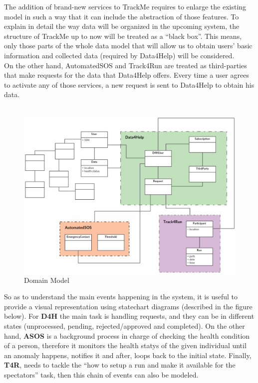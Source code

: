 \documentclass[12pt]{article}
\begin{document}
The addition of brand-new services to TrackMe requires to enlarge the existing model in such a way that it can include the abstraction of those features. To explain in detail the way data will be organized in the upcoming system, the structure of TrackMe up to now will be treated as a “black box”. This means, only those parts of the whole data model that will allow us to obtain users’ basic information and collected data (required by Data4Help) will be considered. \\

 On the other hand, AutomatedSOS and Track4Run are treated as third-parties that make requests for the data that Data4Help offers. Every time a user agrees to activate any of those services, a new request is sent to Data4Help to obtain his data. \\\\

 \begin{figure}[H]
\centering
 \includegraphics[scale=0.5]{Diagrams/domain_model.png}
\caption[Domain Model]{Domain Model}
\label{fig:Domain_model}
\end{figure}

So as to understand the main events happening in the system, it is useful to provide a visual representation using statechart diagrams (described in the figure below). For \textbf {D4H} the main task is handling requests, and they can be in different states (unprocessed, pending, rejected/approved and completed). On the other hand, \textbf {ASOS} is a background process in charge of checking the health condition of a person, therefore it monitors the health statys of the given individual until an anomaly happens, notifies it and after, loops back to the initial state. Finally, \textbf {T4R}, needs to tackle the “how to setup a run and make it available for the spectators” task, then this chain of events can also be modeled.
\end{document}
